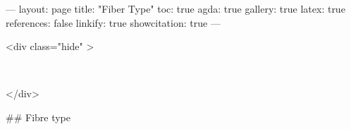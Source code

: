 ---
layout: page
title: "Fiber Type"
toc: true
agda: true
gallery: true
latex: true
references: false
linkify: true
showcitation: true
---

<div class="hide" >
\begin{code}%
\>[0]\AgdaSymbol{\{-\#}\AgdaSpace{}%
\AgdaSpace{}%
\AgdaSpace{}%
\AgdaSymbol{\#-\}}\<%
\\
\>[0]\AgdaSpace{}%
\AgdaSpace{}%
\<%
\end{code}
</div>

## Fibre type

\begin{code}%
\>[0]\<%
\\
\>[0][@{}l@{\AgdaIndent{0}}]%
\>[2]\AgdaSpace{}%
\AgdaSymbol{\{}\AgdaSpace{}%
\AgdaSymbol{:}\AgdaSpace{}%
\AgdaSpace{}%
\AgdaSymbol{\}}\AgdaSpace{}%
\AgdaSymbol{\{}\AgdaSpace{}%
\AgdaSymbol{:}\AgdaSpace{}%
\AgdaSpace{}%
\AgdaSymbol{\}}\<%
\\
\>[2][@{}l@{\AgdaIndent{0}}]%
\>[4]\<%
\end{code}

\begin{code}%
%
\>[2]\<%
\\
%
\>[2]\<%
\\
\>[2][@{}l@{\AgdaIndent{0}}]%
\>[4]\AgdaSymbol{:}\AgdaSpace{}%
\AgdaSymbol{(}\AgdaSpace{}%
\AgdaSymbol{:}\AgdaSpace{}%
\AgdaSpace{}%
\AgdaSpace{}%
\AgdaSymbol{)}\<%
\\
%
\>[4]\AgdaSpace{}%
\AgdaSymbol{(}\AgdaSpace{}%
\AgdaSymbol{:}\AgdaSpace{}%
\AgdaSymbol{)}\<%
\\
%
\>[4]\AgdaComment{---------------}\<%
\\
%
\>[4]\AgdaSpace{}%
\AgdaSpace{}%
\AgdaSymbol{(}\AgdaSpace{}%
\AgdaSpace{}%
\AgdaSymbol{)}\<%
\\
%
\\[\AgdaEmptyExtraSkip]%
%
\>[2]\AgdaSpace{}%
\AgdaSpace{}%
\AgdaSpace{}%
\AgdaSymbol{=}\AgdaSpace{}%
\AgdaSpace{}%
\AgdaSpace{}%
\AgdaSpace{}%
\AgdaSpace{}%
\AgdaSpace{}%
\AgdaSpace{}%
\AgdaSpace{}%
\AgdaOperator{\AgdaDatatype{==}}\AgdaSpace{}%
\AgdaSymbol{)}\<%
\end{code}

